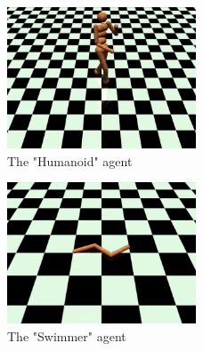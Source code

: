 \begin{figure}[H]
	\includegraphics[width=0.5\textwidth]{images/agent_humanoid.png}
	\centering
	\caption{The "Humanoid" agent}
\end{figure}\label{fig_agent_humanoid}
\begin{figure}[H]
	\includegraphics[width=0.5\textwidth]{images/agent_swimmer.png}
	\centering
	\caption{The "Swimmer" agent}
\end{figure}\label{fig_agent_swimmer}



